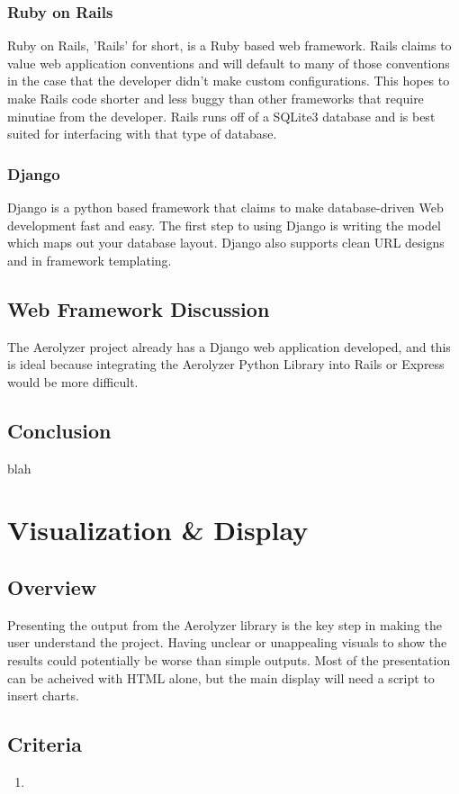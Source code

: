 \documentclass[onecolumn, draftclsnofoot,10pt, compsoc]{IEEEtran}
\begin{document}
\begin{singlespace}
\subsubsection{Ruby on Rails}
 Ruby on Rails, 'Rails' for short, is a Ruby based web framework.
Rails claims to value web application conventions and will default to many of those conventions in the case that the developer didn't make custom configurations.
This hopes to make Rails code shorter and less buggy than other frameworks that require minutiae from the developer.
Rails runs off of a SQLite3 database and is best suited for interfacing with that type of database.
\subsubsection{Django}
Django is a python based framework that claims to make database-driven Web development fast and easy.
The first step to using Django is writing the model which maps out your database layout.
Django also supports clean URL designs and in framework templating.
\subsection{Web Framework Discussion}
The Aerolyzer project already has a Django web application developed, and this is ideal because integrating the Aerolyzer Python Library into Rails or Express would be more difficult. 
\subsection{Conclusion}
blah
\section{Visualization \& Display}
\subsection{Overview}
Presenting the output from the Aerolyzer library is the key step in making the user understand the project.
Having unclear or unappealing visuals to show the results could potentially be worse than simple outputs.
Most of the presentation can be acheived with HTML alone, but the main display will need a script to insert charts.
\subsection{Criteria}
\begin{enumerate}
\item
\end{enumerate}

\end{singlespace}
\end{document}

